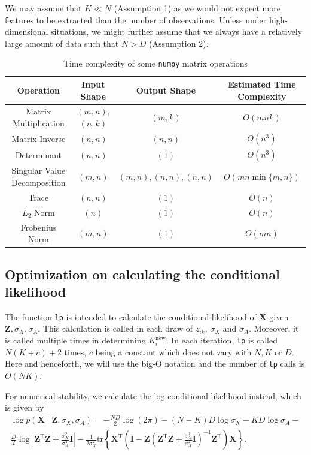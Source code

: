 \documentclass{article}
\begin{document}
We may assume that $K \ll N$ (Assumption 1) as we would not expect more features to be extracted than the number of observations. Unless under high-dimensional situations, we might further assume that we always have a relatively large amount of data such that $N > D$ (Assumption 2).

\begin{table}[!h]
  \centering
  \small
  \caption{Time complexity of some \texttt{numpy} matrix operations}
  \label{tbl::timecplxnp}
  \begin{tabular}{cccc}
    \toprule
    Operation & Input Shape & Output Shape & Estimated Time Complexity \\
    \midrule
    Matrix Multiplication & $(m,n)$, $(n,k)$ & $(m, k)$ & $O(mnk)$ \\
    Matrix Inverse & $(n,n)$ & $(n,n)$ & $O(n^3)$ \\
    Determinant & $(n,n)$ & $(1)$ & $O(n^3)$ \\
    Singular Value Decomposition & $(m,n)$ & $(m,n),(n,n),(n,n)$ & $O(mn\min\{m,n\})$ \\
    Trace & $(n,n)$ & $(1)$ & $O(n)$ \\
    $L_2$ Norm & $(n)$ & $(1)$ & $O(n)$ \\
    Frobenius Norm & $(m,n)$ & $(1)$ & $O(mn)$ \\
    \bottomrule
  \end{tabular}
\end{table}

\subsection{Optimization on calculating the conditional likelihood}\label{sec::lp}
The function \texttt{lp} is intended to calculate the conditional likelihood of $\mathbf{X}$ given $\mathbf{Z}, \sigma_X, \sigma_A$. This calculation is called in each draw of $z_{ik}$, $\sigma_X$ and $\sigma_A$. Moreover, it is called multiple times in determining $K_i^\text{new}$. In each iteration, \texttt{lp} is called $N(K + c) + 2$ times, $c$ being a constant which does not vary with $N, K$ or $D$. Here and henceforth, we will use the big-O notation and the number of \texttt{lp} calls is $O(NK)$.

For numerical stability, we calculate the log conditional likelihood instead, which is given by 
\begin{multline}
  \log p(\mathbf{X}\mid \mathbf{Z}, \sigma_X, \sigma_A) = -\frac{ND}{2}\log(2\pi)-(N-K)D\log{\sigma_X} - KD\log\sigma_A -\\\frac{D}{2}\log \left|{\mathbf{Z}}^{\mathrm{T}}\mathbf{Z}+\frac{\sigma_X^2}{\sigma_A^2}\mathbf{I}\right|
  -\frac{1}{2\sigma_X^2}\mathrm{tr}\left\{{\mathbf{X}}^{\mathrm{T}}\left(\mathbf{I}-\mathbf{Z}\left({\mathbf{Z}}^{\mathrm{T}}\mathbf{Z}+\frac{\sigma_X^2}{\sigma_A^2}\mathbf{I}\right)^{-1}{\mathbf{Z}}^{\mathrm{T}}\right)\mathbf{X}\right\}.
\end{multline}
\end{document}
